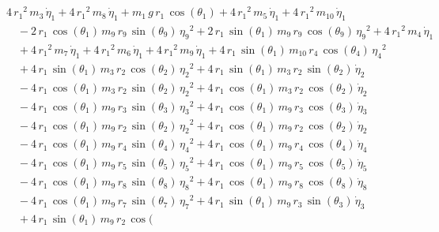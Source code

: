 \begin{eqnarray*} && 4\,{r_{1}}^2\,m_{3}\,{\dot{\eta}_{1}} + 4\,{r_{1}
}^2\,m_{8}\,{\dot{\eta}_{1}} + m_{1}\,g\,r_{1}\,\cos({\theta_{1}}) + 4
\,{r_{1}}^2\,m_{5}\,{\dot{\eta}_{1}} + 4\,{r_{1}}^2\,m_{10}\,{
\dot{\eta}_{1}} \\ &&\quad\mbox{} - 2\,r_{1}\,\cos({\theta_{1}})\,m_{9
}\,r_{9}\,\sin({\theta_{9}})\,{{\eta_{9}}}^2 + 2\,r_{1}\,\sin({\theta
_{1}})\,m_{9}\,r_{9}\,\cos({\theta_{9}})\,{{\eta_{9}}}^2 + 4\,{r_{1}}^
2\,m_{4}\,{\dot{\eta}_{1}} \\ &&\quad\mbox{} + 4\,{r_{1}}^2\,m_{7}\,{
\dot{\eta}_{1}} + 4\,{r_{1}}^2\,m_{6}\,{\dot{\eta}_{1}} + 4\,{r_{1}}^2
\,m_{9}\,{\dot{\eta}_{1}} + 4\,r_{1}\,\sin({\theta_{1}})\,m_{10}\,r_{4
}\,\cos({\theta_{4}})\,{{\eta_{4}}}^2 \\ &&\quad\mbox{} + 4\,r_{1}\,
\sin({\theta_{1}})\,m_{3}\,r_{2}\,\cos({\theta_{2}})\,{{\eta_{2}}}^2
 + 4\,r_{1}\,\sin({\theta_{1}})\,m_{3}\,r_{2}\,\sin({\theta_{2}})\,{
\dot{\eta}_{2}} \\ &&\quad\mbox{} - 4\,r_{1}\,\cos({\theta_{1}})\,m_{3
}\,r_{2}\,\sin({\theta_{2}})\,{{\eta_{2}}}^2 + 4\,r_{1}\,\cos({\theta
_{1}})\,m_{3}\,r_{2}\,\cos({\theta_{2}})\,{\dot{\eta}_{2}}
 \\ &&\quad\mbox{} - 4\,r_{1}\,\cos({\theta_{1}})\,m_{9}\,r_{3}\,\sin(
{\theta_{3}})\,{{\eta_{3}}}^2 + 4\,r_{1}\,\cos({\theta_{1}})\,m_{9}\,r
_{3}\,\cos({\theta_{3}})\,{\dot{\eta}_{3}} \\ &&\quad\mbox{} - 4\,r_{1
}\,\cos({\theta_{1}})\,m_{9}\,r_{2}\,\sin({\theta_{2}})\,{{\eta_{2}}}^
2 + 4\,r_{1}\,\cos({\theta_{1}})\,m_{9}\,r_{2}\,\cos({\theta_{2}})\,{
\dot{\eta}_{2}} \\ &&\quad\mbox{} - 4\,r_{1}\,\cos({\theta_{1}})\,m_{9
}\,r_{4}\,\sin({\theta_{4}})\,{{\eta_{4}}}^2 + 4\,r_{1}\,\cos({\theta
_{1}})\,m_{9}\,r_{4}\,\cos({\theta_{4}})\,{\dot{\eta}_{4}}
 \\ &&\quad\mbox{} - 4\,r_{1}\,\cos({\theta_{1}})\,m_{9}\,r_{5}\,\sin(
{\theta_{5}})\,{{\eta_{5}}}^2 + 4\,r_{1}\,\cos({\theta_{1}})\,m_{9}\,r
_{5}\,\cos({\theta_{5}})\,{\dot{\eta}_{5}} \\ &&\quad\mbox{} - 4\,r_{1
}\,\cos({\theta_{1}})\,m_{9}\,r_{8}\,\sin({\theta_{8}})\,{{\eta_{8}}}^
2 + 4\,r_{1}\,\cos({\theta_{1}})\,m_{9}\,r_{8}\,\cos({\theta_{8}})\,{
\dot{\eta}_{8}} \\ &&\quad\mbox{} - 4\,r_{1}\,\cos({\theta_{1}})\,m_{9
}\,r_{7}\,\sin({\theta_{7}})\,{{\eta_{7}}}^2 + 4\,r_{1}\,\sin({\theta
_{1}})\,m_{9}\,r_{3}\,\sin({\theta_{3}})\,{\dot{\eta}_{3}}
 \\ &&\quad\mbox{} + 4\,r_{1}\,\sin({\theta_{1}})\,m_{9}\,r_{2}\,\cos(

\end{eqnarray*}
